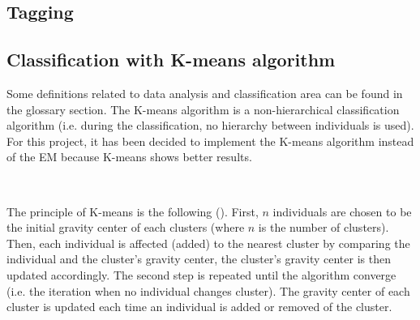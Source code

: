 

\subsection{Tagging}







\subsection{Classification with K-means algorithm}

Some definitions related to \gls{data analysis} and \gls{classification} area can be found in the glossary section. The K-means \gls{algorithm} is a non-hierarchical \gls{classification} \gls{algorithm} (i.e. during the \gls{classification}, no hierarchy between \glspl{individual} is used). For this project, it has been decided to implement the K-means \gls{algorithm} instead of the \gls{EM} because K-means shows better results. 

~~ 

The principle of K-means is the following (\cite{bib:clustering:AnalyseDesDonnees}). First, $n$ \glspl{individual} are chosen to be the initial gravity center of each \glspl{cluster} (where $n$ is the number of clusters). Then, each individual is affected (added) to the nearest \gls{cluster} by comparing the \gls{individual} and the \gls{cluster}'s gravity center, the \gls{cluster}'s gravity center is then  updated accordingly. The second step is repeated until the \gls{algorithm} converge (i.e. the iteration when no \gls{individual} changes \gls{cluster}). The gravity center of each \gls{cluster} is updated each time an \gls{individual} is added or removed of the \gls{cluster}.

